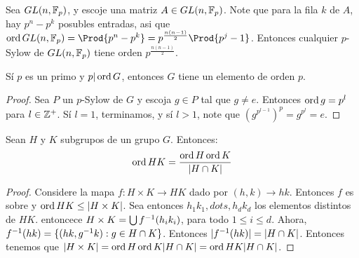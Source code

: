 \begin{example}\label{}
    Sea $GL(n,\mathbb{F}_p)$, y escoje una matriz $A \in GL(n,\mathbb{F}_p)$. Note que para la
    fila $k$ de  $A$, hay  $p^n-p^k$ posubles entradas, asi que
    $\ord{GL(n,\F_p)}=\Prod{p^n-p^k}=p^{\frac{n(n-1)}{2}}\Prod{p^j-1}$. Entonces
    cualquier $p$-Sylow de  $GL(n,\mathbb{F}_p)$ tiene orden $p^{\frac{n(n-1)}{2}}$.
\end{example}

\begin{theorem}\label{8.34}
    S\'i $p$ es un primo y  $p|\operatorname{ord}{G}$, entonces $G$ tiene un elemento de orden
     $p$.
\end{theorem}
\begin{proof}
    Sea $P$ un $p$-Sylow de $G$ y escoja  $g \in P$ tal que  $g \neq e$.
    Entonces $\operatorname{ord}{g}=p^l$ para $l \in \mathbb{Z}^+$. S\'i  $l=1$, terminamos, y s\'i
    $l>1$, note que  $(g^p^{l-1})^p=g^{p^l}=e$.
\end{proof}

\begin{lemma}\label{8.35}
    Sean $H$ y $K$ subgrupos de un grupo $G$. Entonces:
    \begin{equation*}
        \operatorname{ord}{HK}=\frac{\operatorname{ord}{H}\operatorname{ord}{K}}{|H \cap K|}
    \end{equation*}
\end{lemma}
\begin{proof}
    Considere la mapa $f:H \times K \xrightarrow{} HK$ dado por $(h,k)
    \xrightarrow{} hk$. Entonces $f$ es sobre y  $\operatorname{ord}{HK} \leq |H \times K|$.
    Sea entonces $h_1k_1, dots, h_dk_d$ los elementos distintos de $HK$.
    entoncece  $H \times K=\bigcup{f^{-1}(h_ik_i)}$, para todo $1 \leq i \leq
    d$. Ahora,  $f^{-1}(hk)=\{(hk,g^{-1}k) : g \in H \cap K\}$. Entonces
    $|f^{-1}(hk)|=|H \cap K|$. Entonces tenemos que $|H \times
    K|=\operatorname{ord}{H}\operatorname{ord}{K}|H \cap K|=\operatorname{ord}{HK}|H \cap K|$.
\end{proof}

